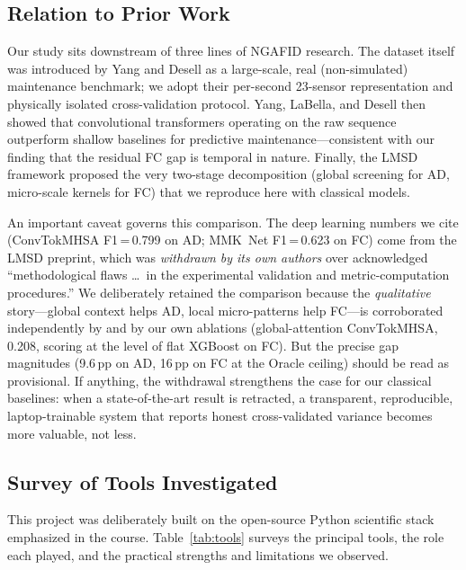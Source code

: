 \subsection{Relation to Prior Work}
\label{subsec:related}

Our study sits downstream of three lines of NGAFID research. The dataset itself
was introduced by Yang and Desell \cite{ngafid2021} as a large-scale, real
(non-simulated) maintenance benchmark; we adopt their per-second 23-sensor
representation and physically isolated cross-validation protocol. Yang,
LaBella, and Desell \cite{convtok2023} then showed that convolutional
transformers operating on the raw sequence outperform shallow baselines for
predictive maintenance---consistent with our finding that the residual FC gap is
temporal in nature. Finally, the LMSD framework \cite{lmsd2025} proposed the very
two-stage decomposition (global screening for AD, micro-scale kernels for FC)
that we reproduce here with classical models.

An important caveat governs this comparison. The deep learning numbers we cite
(ConvTokMHSA F1\,=\,0.799 on AD; MMK~Net F1\,=\,0.623 on FC) come from the LMSD
preprint, which was \emph{withdrawn by its own authors} over acknowledged
``methodological flaws \ldots\ in the experimental validation and
metric-computation procedures.'' We deliberately retained the comparison because
the \emph{qualitative} story---global context helps AD, local micro-patterns help
FC---is corroborated independently by \cite{convtok2023} and by our own ablations
(global-attention ConvTokMHSA, 0.208, scoring at the level of flat XGBoost on FC).
But the precise gap magnitudes (9.6\,pp on AD, 16\,pp on FC at the Oracle ceiling)
should be read as provisional.
If anything, the withdrawal strengthens the case for our classical baselines:
when a state-of-the-art result is retracted, a transparent, reproducible,
laptop-trainable system that reports honest cross-validated variance becomes more
valuable, not less.

\subsection{Survey of Tools Investigated}
\label{subsec:tools}

This project was deliberately built on the open-source Python scientific stack
emphasized in the course. Table~\ref{tab:tools} surveys the principal tools, the
role each played, and the practical strengths and limitations we observed.

